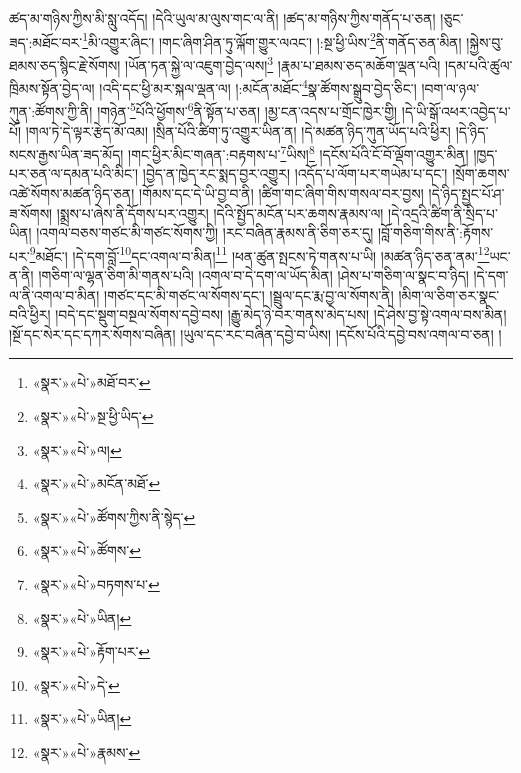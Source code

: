 ཚད་མ་གཉིས་ཀྱིས་མི་སླུ་འདོད། །དེའི་ཡུལ་མ་ལུས་གང་ལ་ནི། །ཚད་མ་གཉིས་ཀྱིས་གནོད་པ་ཅན། །ཅུང་ཟད་:མཐོང་བར་\footnote{«སྣར་»«པེ་»མཐོ་བར་}མི་འགྱུར་ཞིང་། །གང་ཞིག་ཤིན་ཏུ་ལྐོག་གྱུར་ལའང་། །:སྔ་ཕྱི་ཡིས་\footnote{«སྣར་»«པེ་»སྔ་ཕྱི་ཡིད་}ནི་གནོད་ཅན་མིན། །སྐྱེས་བུ་ཐམས་ཅད་སྙིང་རྗེ་སོགས། །ཡོན་ཏན་སྐྱེ་ལ་འཇུག་བྱེད་ལས།\footnote{«སྣར་»«པེ་»ལ།} །རྣམ་པ་ཐམས་ཅད་མཆོག་ལྡན་པའི། །དམ་པའི་ཚུལ་ཁྲིམས་སྟོན་བྱེད་ལ། །འདི་དང་ཕྱི་མར་སྐལ་ལྡན་ལ། །:མངོན་མཐོང་\footnote{«སྣར་»«པེ་»མངོན་མཐོ་}སྣ་ཚོགས་སྒྲུབ་བྱེད་ཅིང་། །བག་ལ་ཉལ་ཀུན་:ཚོགས་ཀྱི་ནི། །གཉེན་\footnote{«སྣར་»«པེ་»ཚོགས་ཀྱིས་ནི་སྙེད་}པོའི་ཕྱོགས་\footnote{«སྣར་»«པེ་»ཚོགས་}ནི་སྟོན་པ་ཅན། །མྱ་ངན་འདས་པ་གྲོང་ཁྱེར་གྱི། །དེ་ཡི་སྒོ་འཕར་འབྱེད་པ་པོ། །གལ་ཏེ་དེ་ལྟར་རྩེད་མོ་འམ། །སྲིན་པོའི་ཚིག་ཏུ་འགྱུར་ཡིན་ན། །དེ་མཚན་ཉིད་ཀུན་ཡོད་པའི་ཕྱིར། །དེ་ཉིད་སངས་རྒྱས་ཡིན་ཟད་མོད། །གང་ཕྱིར་མིང་གཞན་:བརྟགས་པ་\footnote{«སྣར་»«པེ་»བཏགས་པ་}ཡིས།\footnote{«སྣར་»«པེ་»ཡིན།} །དངོས་པོའི་ངོ་བོ་ལྡོག་འགྱུར་མིན། །ཁྱད་པར་ཅན་ལ་དམན་པའི་མིང་། །བྱེད་ན་ཁྱེད་རང་སྨད་བྱར་འགྱུར། །འདོད་པ་ལོག་པར་གཡེམ་པ་དང་། །སྲོག་ཆགས་འཚེ་སོགས་མཚན་ཉིད་ཅན། །གོམས་དང་དེ་ཡི་བྱ་བ་ནི། །ཚིག་གང་ཞིག་གིས་གསལ་བར་བྱས། །དེ་ཉིད་སྤྱང་པོ་ཤ་ཟ་སོགས། །སྨྲས་པ་ཞེས་ནི་དོགས་པར་འགྱུར། །དེའི་སྤྱོད་མངོན་པར་ཆགས་རྣམས་ལ། །དེ་འདྲའི་ཚིག་ནི་སྲིད་པ་ཡིན། །འགལ་བཅས་གཙང་མི་གཙང་སོགས་ཀྱི། །རང་བཞིན་རྣམས་ནི་ཅིག་ཅར་དུ། །བློ་གཅིག་གིས་ནི་:རྟོགས་པར་\footnote{«སྣར་»«པེ་»རྟོག་པར་}མཐོང་། །དེ་དག་བློ་\footnote{«སྣར་»«པེ་»དེ་}དང་འགལ་བ་མིན།\footnote{«སྣར་»«པེ་»ཡིན།} །ཕན་ཚུན་སྤངས་ཏེ་གནས་པ་ཡི། །མཚན་ཉིད་ཅན་ནམ་\footnote{«སྣར་»«པེ་»རྣམས་}ཡང་ན་ནི། །གཅིག་ལ་ལྷན་ཅིག་མི་གནས་པའི། །འགལ་བ་དེ་དག་ལ་ཡོད་མིན། །ཤེས་པ་གཅིག་ལ་སྣང་བ་ཉིད། །དེ་དག་ལ་ནི་འགལ་བ་མིན། །གཙང་དང་མི་གཙང་ལ་སོགས་དང་། །སྦྲུལ་དང་རྨ་བྱ་ལ་སོགས་ནི། །མིག་ལ་ཅིག་ཅར་སྣང་བའི་ཕྱིར། །བདེ་དང་སྡུག་བསྔལ་སོགས་དབྱེ་བས། །རྒྱུ་མེད་ཉེ་བར་གནས་མེད་པས། །དེ་ཤེས་བྱ་སྟེ་འགལ་བས་མིན། །སྔོ་དང་སེར་དང་དཀར་སོགས་བཞིན། །ཡུལ་དང་རང་བཞིན་དབྱེ་བ་ཡིས། །དངོས་པོའི་དབྱེ་བས་འགལ་བ་ཅན། །
